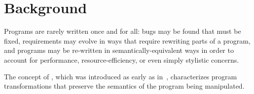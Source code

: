 \section{Background}

Programs are rarely written once and for all: bugs may be found that must be
fixed, requirements may evolve in ways that require rewriting parts of a
program, and programs may be re-written in semantically-equivalent ways in order
to account for performance, resource-efficiency, or even simply stylistic
concerns.

The concept of , which was introduced as early as
in~\citet{wirfs1990surveying}, characterizes program transformations that
preserve the semantics of the program being manipulated.


